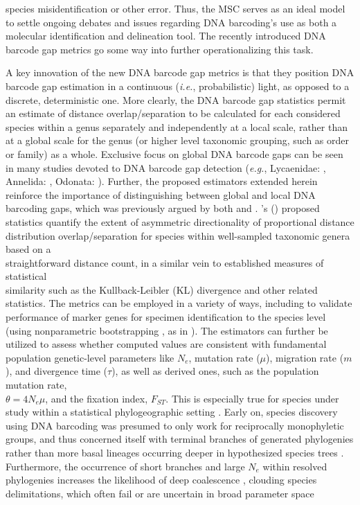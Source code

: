 \documentclass[12pt]{article}
\begin{document}
species misidentification or other error. Thus, the MSC serves as an ideal model to settle ongoing debates and issues regarding DNA barcoding's use as both a molecular identification and delineation tool. The recently introduced DNA barcode gap metrics go some way into further operationalizing this task.

A key innovation of the new DNA barcode gap metrics is that they position  DNA barcode gap estimation in a continuous (\textit{i.e.}, probabilistic) light, as opposed to a discrete, deterministic one. More clearly, the DNA barcode gap statistics permit an estimate of distance overlap/separation to be calculated for each considered species within a genus separately and independently at a local scale, rather than at a global scale for the  genus (or higher level taxonomic grouping, such as order or family) as a whole. Exclusive focus on global DNA barcode gaps can be seen in many studies devoted to DNA barcode gap detection (\textit{e.g.}, Lycaenidae: \citet{wiemers2007does}, Annelida: \citet{kvist2014does}, Odonata: \citet{koroiva2018estimating}). Further, the proposed estimators extended herein reinforce the importance of distinguishing between global and local DNA barcoding gaps, which was previously argued by both \citet{collins2013seven} and \citet{phillips2022lack}. \citeauthor{phillips2024measure}'s (\citeyear{phillips2024measure}) proposed statistics quantify the extent of asymmetric directionality of proportional distance distribution overlap/separation for species within well-sampled taxonomic genera based on a \\ straightforward distance count, in a similar vein to established measures of statistical \\ similarity such as the Kullback-Leibler (KL) divergence \citep{kullback1951information} and other related statistics. The metrics can be employed in a variety of ways, including to validate performance of marker genes for specimen identification to the species level (using nonparametric bootstrapping \citep{efron1979bootstrap}, as in \citet{phillips2024measure}). The estimators can further be utilized to assess whether computed values are consistent with fundamental population genetic-level parameters like $N_e$, mutation rate ($\mu$), migration rate ($m$), and divergence time ($\tau$), as well as derived ones, such as the population mutation rate, \\ $\theta = 4N_e\mu$, and the fixation index, $F_{ST}$. This is especially true for species under study within a statistical phylogeographic setting \citep{knowles2002statistical, knowles2004burgeoning, knowles2009phylogeo, mather2019practical}. Early on, species discovery using DNA barcoding was presumed to only work for reciprocally monophyletic groups, and thus concerned itself with terminal branches of generated phylogenies rather than more basal lineages occurring deeper in hypothesized species trees \citep{fujita2012coalescent, mutanen2016species}. Furthermore, the occurrence of short branches and large $N_e$ within resolved phylogenies increases the likelihood of deep coalescence \citep{degnan2009gene}, clouding species  delimitations, which often fail or are uncertain in broad parameter space 
\end{document}
